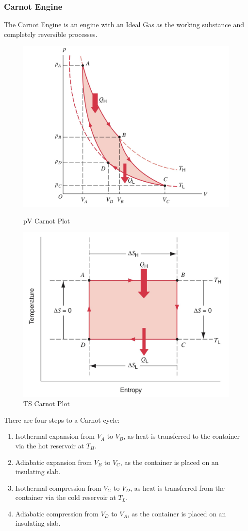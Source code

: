 \documentclass[../PhysicsFormulae.tex]{subfiles}
\begin{document}
\subsubsection{Carnot Engine}
The Carnot Engine is an engine with an Ideal Gas as the working substance and completely reversible processes. 
\begin{figure}
\centering
\begin{minipage}{.5\textwidth}
  \centering
  \includegraphics[width=0.8\linewidth]{images/20.carnot_pv.jpg}
  \caption{pV Carnot Plot}
  \label{fig:carnot_pv}
\end{minipage}%
\begin{minipage}{.5\textwidth}
  \centering
  \includegraphics[width=0.8\linewidth]{images/20.carnot_st.jpg}
  \caption{TS Carnot Plot}
  \label{fig:carnot_st}
\end{minipage}
\end{figure}
There are four steps to a Carnot cycle: 
\begin{enumerate}
	\item Isothermal expansion from $V_A$ to $V_B$, as heat is transferred to the container via the hot reservoir at $T_H$. 
	\item Adiabatic expansion from $V_B$ to $V_C$, as the container is placed on an insulating slab. 
	\item Isothermal compression from $V_C$ to $V_D$, as heat is transferred from the container via the cold reservoir at $T_L$. 
	\item Adiabatic compression from $V_D$ to $V_A$, as the container is placed on an insulating slab. 
\end{enumerate}
\end{document}
